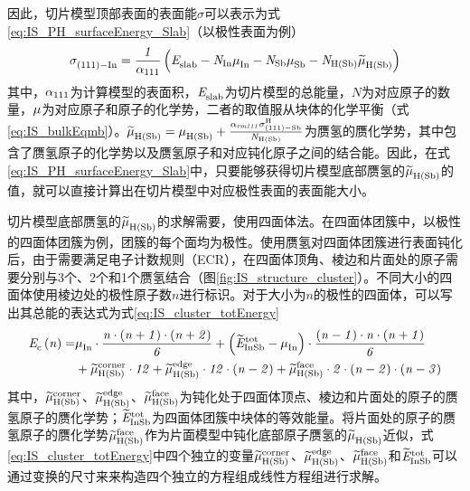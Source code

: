 因此，切片模型顶部表面的表面能$\sigma$可以表示为式\eqref{eq:IS_PH_surfaceEnergy_Slab}（以极性表面为例）\chinesecolon
\begin{equation}
    \label{eq:IS_PH_surfaceEnergy_Slab}
    \it \sigma_{\rm \left(111\right)-In}^{\rm } \it
    =\frac{1}{\alpha _{\rm 111}}\left(\it E_{\rm slab}^{\rm } \it-N_{\rm In}\it \mu_{\rm In}^{\rm } \it-N_{\rm Sb}\it \mu_{\rm Sb}^{\rm } \it-N_{\rm H\left(Sb\right)} \it \widetilde{\mu}_{\rm H\left(Sb\right)}^{\rm } \it \right)
\end{equation}
其中，$\alpha _{\rm 111}$为计算模型的表面积，$\it E_{\rm slab}^{\rm } \it$为切片模型的总能量，$N$为对应原子的数量，$\it \mu_{\rm }^{\rm } \it$为对应原子和原子的化学势，二者的取值服从块体的化学平衡（式\eqref{eq:IS_bulkEqmb}）。$\it \widetilde{\mu}_{\rm H\left(Sb\right)}^{\rm } \it=\it \mu_{\rm H\left(Sb\right)}^{\rm } \it+\frac{\alpha _{rm 111}\sigma_{\rm \left(111\right)-Sb}^{\rm H}}{N_{\rm H\left(Sb\right)}}$为赝氢的赝化学势，其中包含了赝氢原子的化学势以及赝氢原子和对应钝化原子之间的结合能。因此，在式\eqref{eq:IS_PH_surfaceEnergy_Slab}中，只要能够获得切片模型底部赝氢的$\it \widetilde{\mu}_{\rm H\left(Sb\right)}^{\rm } \it$的值，就可以直接计算出在切片模型中对应极性表面的表面能大小。

切片模型底部赝氢的$\it \widetilde{\mu}_{\rm H\left(Sb\right)}^{\rm } \it$的求解需要，使用四面体法。在四面体团簇中，以极性的四面体团簇为例，团簇的每个面均为极性。使用赝氢对四面体团簇进行表面钝化后，由于需要满足电子计数规则（ECR），在四面体顶角、棱边和片面处的原子需要分别与3个、2个和1个赝氢结合（图\ref{fig:IS_structure_cluster}）。不同大小的四面体使用棱边处的极性原子数$n$进行标识。对于大小为$n$的极性的四面体，可以写出其总能的表达式为式\eqref{eq:IS_cluster_totEnergy}\chinesecolon
\begin{equation}
    \label{eq:IS_cluster_totEnergy}
    \begin{split}
        \it E_{\rm c}^{\rm } \it\left(n\right)=&\it \mu_{\rm In}^{\rm } \it \cdot \frac{n\cdot \left(n+1\right) \cdot \left(n+2\right)}{6} +\left(\it \widetilde{E}_{\rm InSb}^{\rm tot} \it-\it \mu_{\rm In}^{\rm } \it\right)\cdot \frac{\left(n-1\right)\cdot n \cdot \left(n+1\right)}{6}\\
        &+\it \widetilde{\mu}_{\rm H\left(Sb\right)}^{\rm corner} \it\cdot 12 + \it \widetilde{\mu}_{\rm H\left(Sb\right)}^{\rm edge} \it\cdot 12 \cdot \left(n-2\right) + \it \widetilde{\mu}_{\rm H\left(Sb\right)}^{\rm face} \it\cdot 2 \cdot (n-2) \cdot (n-3)
    \end{split}
\end{equation}
其中，$\it \widetilde{\mu}_{\rm H\left(Sb\right)}^{\rm corner} \it$、$\it \widetilde{\mu}_{\rm H\left(Sb\right)}^{\rm edge} \it$、$\it \widetilde{\mu}_{\rm H\left(Sb\right)}^{\rm face} \it$为钝化处于四面体顶点、棱边和片面处的原子的赝氢原子的赝化学势；$\it \widetilde{E}_{\rm InSb}^{\rm tot} \it$为四面体团簇中块体的等效能量。将片面处的原子的赝氢原子的赝化学势$\it \widetilde{\mu}_{\rm H\left(Sb\right)}^{\rm face} \it$作为片面模型中钝化底部原子赝氢的$\it \widetilde{\mu}_{\rm H\left(Sb\right)}^{\rm } \it$近似，式\eqref{eq:IS_cluster_totEnergy}中四个独立的变量$\it \widetilde{\mu}_{\rm H\left(Sb\right)}^{\rm corner} \it$、$\it \widetilde{\mu}_{\rm H\left(Sb\right)}^{\rm edge} \it$、$\it \widetilde{\mu}_{\rm H\left(Sb\right)}^{\rm face} \it$和$\it \widetilde{E}_{\rm InSb}^{\rm tot} \it$可以通过变换的尺寸来来构造四个独立的方程组成线性方程组进行求解。

